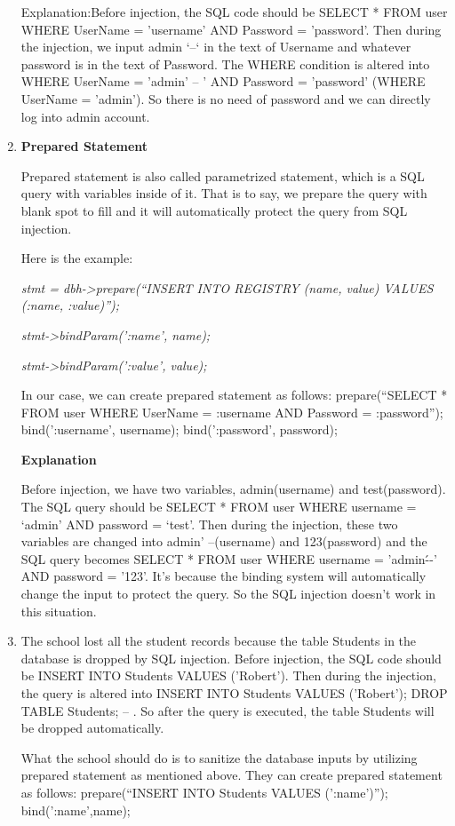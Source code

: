 \begin{enumerate}
\begin{center}
	\end{center}
	Explanation:Before injection, the SQL code should be SELECT * FROM user WHERE UserName = 'username’ AND Password = ’password’. Then during the injection, we input admin ‘--‘ in the text of Username and whatever password is in the text of Password. The WHERE condition is altered into WHERE UserName = 'admin' -- ' AND Password = ’password’ (WHERE UserName = 'admin'). So there is no need of password and we can directly log into admin account.
\item \textbf{Prepared Statement} 
	\par Prepared statement is also called parametrized statement, which is a SQL query with variables inside of it. That is to say, we prepare the query with blank spot to fill and it will automatically protect the query from SQL injection.
	\par Here is the example:
	\par \textit{stmt = dbh->prepare(“INSERT INTO REGISTRY (name, value) VALUES (:name, :value)”);}
	\par \textit{stmt->bindParam(':name', name);}
	\par \textit{stmt->bindParam(':value', value);}
	\par In our case, we can create prepared statement as follows:
prepare(“SELECT * FROM user WHERE UserName = :username AND Password = :password”);
bind(':username', username);
bind(':password', password);
	\par
	\par \textbf{Explanation}
	\par Before injection, we have two variables, admin(username) and test(password). The SQL query should be SELECT * FROM user WHERE username = ‘admin’ AND password = ‘test’. Then during the injection, these two variables are changed into admin' --(username) and 123(password) and the SQL query becomes SELECT * FROM user WHERE username = 'admin\' --' AND password = '123'. It’s because the binding system will automatically change the input to protect the query. So the SQL injection doesn't work in this situation.
\item The school lost all the student records because the table Students in the database is dropped by SQL injection. Before injection, the SQL code should be INSERT INTO Students VALUES ('Robert'). Then during the injection, the query is altered into INSERT INTO Students VALUES ('Robert'); DROP TABLE Students; -- . So after the query is executed, the table Students will be dropped automatically.

What the school should do is to sanitize the database inputs by utilizing prepared statement as mentioned above. They can create prepared statement as follows:
prepare(“INSERT INTO Students VALUES (':name')”);
bind(':name',name);

\end{enumerate}
